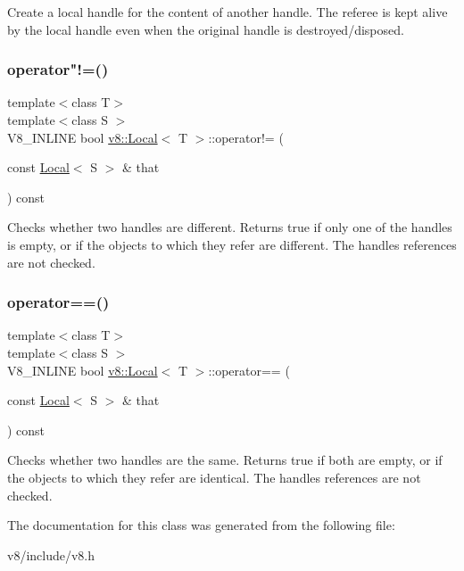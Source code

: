 Create a local handle for the content of another handle. The referee is kept alive by the local handle even when the original handle is destroyed/disposed. \mbox{\label{classv8_1_1Local_a3b2ae1c0415d319099ebc2fd059dbb10}} 
\subsubsection{\texorpdfstring{operator"!=()}{operator!=()}}
{\footnotesize\ttfamily template$<$class T$>$ \\
template$<$class S $>$ \\
V8\+\_\+\+I\+N\+L\+I\+NE bool \mbox{\hyperlink{classv8_1_1Local}{v8\+::\+Local}}$<$ T $>$\+::operator!= (\begin{DoxyParamCaption}\item[{const \mbox{\hyperlink{classv8_1_1Local}{Local}}$<$ S $>$ \&}]{that }\end{DoxyParamCaption}) const\hspace{0.3cm}{\ttfamily [inline]}}

Checks whether two handles are different. Returns true if only one of the handles is empty, or if the objects to which they refer are different. The handles\textquotesingle{} references are not checked. \mbox{\label{classv8_1_1Local_a0dfaa25015487674f568a4e1cd0be48c}} 
\subsubsection{\texorpdfstring{operator==()}{operator==()}}
{\footnotesize\ttfamily template$<$class T$>$ \\
template$<$class S $>$ \\
V8\+\_\+\+I\+N\+L\+I\+NE bool \mbox{\hyperlink{classv8_1_1Local}{v8\+::\+Local}}$<$ T $>$\+::operator== (\begin{DoxyParamCaption}\item[{const \mbox{\hyperlink{classv8_1_1Local}{Local}}$<$ S $>$ \&}]{that }\end{DoxyParamCaption}) const\hspace{0.3cm}{\ttfamily [inline]}}

Checks whether two handles are the same. Returns true if both are empty, or if the objects to which they refer are identical. The handles\textquotesingle{} references are not checked. 

The documentation for this class was generated from the following file\+:\begin{DoxyCompactItemize}
\item 
v8/include/v8.\+h\end{DoxyCompactItemize}
